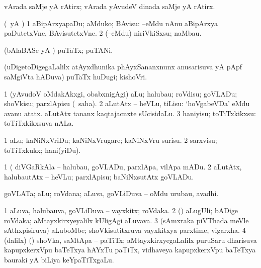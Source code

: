 \bentry
{} 
\gl{\nA}
\expl{}
\bmng
vArada saMje yA rAtirx; vArada yAvudeV dinada saMje yA rAtirx. 
\emng
\eentry

\bentry
{} 
\gl{\akirx}
\expl{}
\bmng
(\pArxparx\ yA \kAparx) 
\bnum
\num{1} aBipArxyapaDu; aMduko; BAvisu:  --eMdu nAnu aBipArxya paDutetxVne, BAvisutetxVne. 
\num{2} (--eMdu) niriVkiSxsu; naMbau. 
\enum
\emng
\eentry

\bentry
{} 
\gl{\gu}
\bmng
(bAlaBASe yA \AmA) puTaTx; puTANi. 
\emng
\eentry

\bentry
{} 
\gl{\nA}
\expl{}
\bmng
(uDigetoDigegaLalilx atAyxdhunika phAyxSananxnunx anusarisuva yA pApf saMgiVta hADuva) puTaTx huDugi; kishoVri. 
\emng
\eentry

\bentry
{} 
\gl{\sakirx}
\expl{}
\bmng
\bnum
\num{1} (yAvudoV oMdakAkxgi, obabxnigAgi) aLu; halubau; roVdisu; goVLADu; shoVkisu; parxlApisu (\akirx\ saha). 
\num{2} aLutAtx -- heVLu, tiLisu:  `hoVgabeVDa' eMdu avanu atatx.  aLutAtx tananx kaqtajacnxte sUcisidaLu. 
\num{3} haniyisu; toTiTxkikxsu:  toTiTxkikxsuva nALa. 
\enum
\emng

\noindent 
\gl{\akirx}
\expl{}
\bmng
\bnum
\num{1} aLu; kaNiNxVriDu; kaNiNxVrugare; kaNiNxVru surisu. 
\num{2} sarxvisu; toTiTxkukx; hani(yiDu). 
\enum
\emng

\noindent 
\gl{\pagu}
\expl{}
\bmng
\bnum
\num{1}  (  diVGaRkAla -- halubau, goVLADu, parxlApa, vilApa mADu. 
\num{2}  aLutAtx, halubautAtx -- heVLu; parxlApisu; baNiNxsutAtx goVLADu. 
\enum
\emng
\eentry

\bentry
{} 
\gl{\nA}
\expl{}
\bmng
goVLATa; aLu; roVdana; aLuva, goVLiDuva -- oMdu urubau, avadhi. 
\emng
\eentry

\bentry
{} 
\gl{\nA}
\expl{}
\bmng
\bnum
\num{1} aLuva, halubauva, goVLiDuva -- vayxkitx; roVdaka. 
\num{2} (\ca) aLugUli; bADige roVdaka; aMtayxkirxyeyalilx kUligAgi aLuvava. 
\num{3} (sAmxraka piVThada meVle sAthxpisiruva) aLuboMbe; shoVkisutitxruva vayxkitxya parxtime, vigarxha. 
\num{4} (\bava dalilx) (\ca) shoVka, saMtApa -- paTiTx; aMtayxkirxyegaLalilx puruSaru dharisuva kapupxkerxVpu baTeTxya hAYxTu paTiTx, vidhaveya kapupxkerxVpu baTeTxya bauraki yA biLiya keYpaTiTxgaLu. 
\enum
\emng
\eentry

